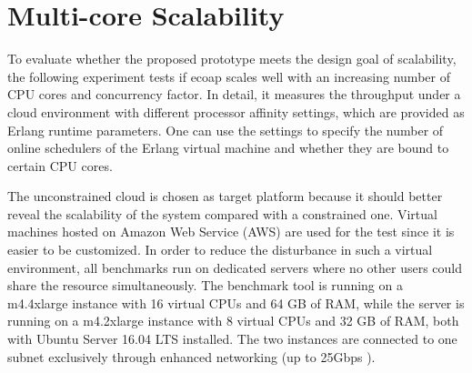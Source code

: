 



\section{Multi-core Scalability} \label{multi_core_scalability}

To evaluate whether the proposed prototype meets the design goal of scalability, the following experiment tests if ecoap scales well with an increasing number of CPU cores and concurrency factor. In detail, it measures the throughput under a cloud environment with different processor affinity settings, which are provided as Erlang runtime parameters. One can use the settings to specify the number of online schedulers of the Erlang virtual machine and whether they are bound to certain CPU cores.

The unconstrained cloud is chosen as target platform because it should better reveal the scalability of the system compared with a constrained one. Virtual machines hosted on Amazon Web Service (AWS) are used for the test since it is easier to be customized. In order to reduce the disturbance in such a virtual environment, all benchmarks run on dedicated servers where no other users could share the resource simultaneously. The benchmark tool is running on a m4.4xlarge instance with 16 virtual CPUs and 64 GB of RAM, while the server is running on a m4.2xlarge instance with 8 virtual CPUs and 32 GB of RAM, both with Ubuntu Server 16.04 LTS installed. The two instances are connected to one subnet exclusively through enhanced networking (up to 25Gbps \cite{aws_instance}). 

